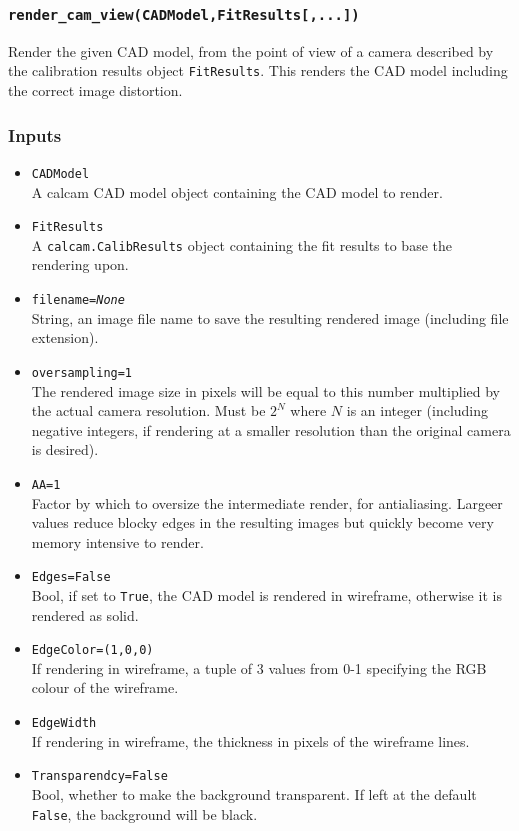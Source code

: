 \documentclass[12pt]{article}
\newcommand{\code}[1]{\texttt{#1}}
\begin{document}
\subsubsection*{\code{render\_cam\_view(CADModel,FitResults[,...])}}
\begin{adjustwidth}{0.5cm}{0cm}
Render the given CAD model, from the point of view of a camera described by the calibration results object \code{FitResults}. This renders the CAD model including the correct image distortion.
\subsubsection*{Inputs}
\begin{itemize}
\item{\code{CADModel}\\A calcam CAD model object containing the CAD model to render.}
\item{\code{FitResults}\\A \code{calcam.CalibResults} object containing the fit results to base the rendering upon.}
\item{\code{filename={\it None}}\\String, an image file name to save the resulting rendered image (including file extension).}
\item{\code{oversampling=1}\\The rendered image size in pixels will be equal to this number multiplied by the actual camera resolution. Must be $2^N$ where $N$ is an integer (including negative integers, if rendering at a smaller resolution than the original camera is desired).}
\item{\code{AA=1}\\Factor by which to oversize the intermediate render, for antialiasing. Largeer values reduce blocky edges in the resulting images but quickly become very memory intensive to render.}
\item{\code{Edges=False}\\Bool, if set to \code{True}, the CAD model is rendered in wireframe, otherwise it is rendered as solid.}
\item{\code{EdgeColor=(1,0,0)}\\If rendering in wireframe, a tuple of 3 values from 0-1 specifying the RGB colour of the wireframe.}
\item{\code{EdgeWidth}\\If rendering in wireframe, the thickness in pixels of the wireframe lines.}
\item{\code{Transparendcy=False}\\Bool, whether to make the background transparent. If left at the default \code{False}, the background will be black.}

\end{itemize}
\end{adjustwidth}
\end{document}
